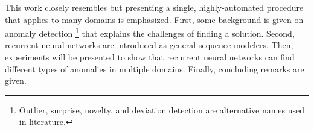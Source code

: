 This work closely resembles \cite{Malhotra2015} but presenting a single, highly-automated procedure that applies to many domains is emphasized. First, some background is given on anomaly detection \footnote{Outlier, surprise, novelty, and deviation detection are alternative names used in literature.} that explains the challenges of finding a solution. Second, recurrent neural networks are introduced as general sequence modelers. Then, experiments will be presented to show that recurrent neural networks can find different types of anomalies in multiple domains. Finally, concluding remarks are given.


